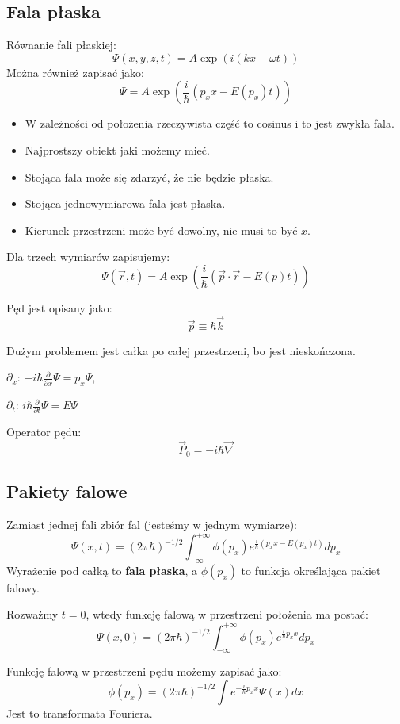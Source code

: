 \subsection{Fala płaska}
Równanie fali płaskiej:
\[
\Psi(x,y,z,t) = A \exp \left( i \left( kx - \omega t \right) \right)
\]
Można również zapisać jako:
\[
\Psi = A \exp \left( \frac{i}{\hbar} (p_x x - E(p_x) t) \right)
\]
\begin{itemize}
    \item W zależności od położenia rzeczywista część to cosinus i to jest zwykła fala.
    \item Najprostszy obiekt jaki możemy mieć.
    \item Stojąca fala może się zdarzyć, że nie będzie płaska.
    \item Stojąca jednowymiarowa fala jest płaska.
    \item Kierunek przestrzeni może być dowolny, nie musi to być $x$.
\end{itemize}

Dla trzech wymiarów zapisujemy:
\[
\Psi(\vec{r}, t) = A \exp \left( \frac{i}{\hbar} (\vec{p} \cdot \vec{r} - E(p) t) \right)
\]

Pęd jest opisany jako:
\[
\vec{p} \equiv \hbar \vec{k}
\]

Dużym problemem jest całka po całej przestrzeni, bo jest nieskończona.

$\partial_x$: $-i\hbar \frac{\partial}{\partial x} \Psi = p_x \Psi$,

$\partial_t$: $i\hbar \frac{\partial}{\partial t} \Psi = E \Psi$

Operator pędu:
\[
\vec{P}_0 = -i\hbar \vec{\nabla}
\]

\subsection{Pakiety falowe}
Zamiast jednej fali zbiór fal (jesteśmy w jednym wymiarze):
\[
\Psi(x,t) = (2\pi\hbar)^{-1/2} \int_{-\infty}^{+\infty} \phi(p_x) e^{\frac{i}{\hbar} (p_x x - E(p_x) t)} dp_x
\]
Wyrażenie pod całką to \textbf{fala płaska}, a $\phi(p_x)$ to funkcja określająca pakiet falowy.

Rozważmy $t = 0$, wtedy funkcję falową w przestrzeni położenia ma postać:
\[
\Psi(x,0) = (2\pi\hbar)^{-1/2} \int_{-\infty}^{+\infty} \phi(p_x) e^{\frac{i}{\hbar} p_x x} dp_x
\]

Funkcję falową w przestrzeni pędu możemy zapisać jako:
\[
\phi(p_x) = (2\pi\hbar)^{-1/2} \int e^{-\frac{i}{\hbar} p_x x} \Psi(x) dx
\]
Jest to transformata Fouriera.


